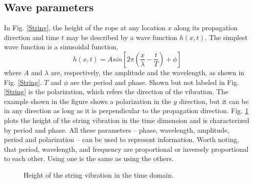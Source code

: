 \documentclass[oneside, letter, 12pt]{book}
\begin{document}
\subsection{Wave parameters}
In Fig. \ref{String}, the height of the rope at any location $x$ along its propagation direction and time $t$ may be described by a wave function $h(x,t)$. The simplest wave function is a sinusoidal function,
\begin{equation}\label{e-hWave}
    h(x,t) = A sin[2\pi (\frac x \lambda - \frac t T) +\phi]
\end{equation}
where $A$ and $\lambda$ are, respectively, the amplitude and the wavelength, as shown in Fig. \ref{String}. $T$ and $\phi$ are the period and phase. Shown but not labeled in Fig. \ref{String} is the polarization, which refers the direction of the vibration. The example shown in the figure shows a polarization in the $y$ direction, but it can be in any direction as long as it is perpendicular to the propagation direction. Fig. \ref{Wave} plots the height of the string vibration in the time dimension and is characterized by period and phase. All these parameters -- phase, wavelength, amplitude, period and polarization -- can be used to represent information. Worth noting, that period, wavelength, and frequency are proportional or inversely proportional to each other. Using one is the same as using the others.

\begin{figure}[h]\label{Wave}
\caption{Height of the string vibration in the time domain.}
\end{figure}
\end{document}
